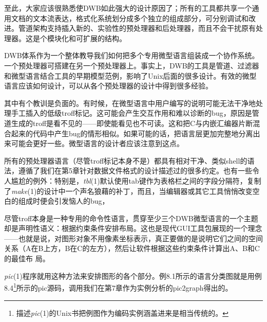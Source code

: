 \documentclass[12pt,oneside]{book}
\begin{document}
\begin{common-format}
至此，大家应该很熟悉使DWB如此强大的设计原因了；所有的工具都共享一个通用文档的文本流表达，格式化系统划分成多个独立的组成部分，可分别调试和改进。管道架构支持插入新的、实验性的预处理器和后处理器，而且不会干扰原有处理器。这是个模块化和可扩展的结构。

DWB体系作为一个整体教导我们如何把多个专用微型语言组装成一个协作系统。一个预处理器可搭建在另一个预处理器上。事实上，DWB的工具是管道、过滤器和微型语言结合工具的早期模型范例，影响了Unix后面的很多设计。有效的微型语言应该如何设计，可以从各个预处理器的设计中得到很多经验。

其中有个教训是负面的。有时候，在微型语言中用户编写的说明可能无法干净地处理手工插入的低级troff标记。这可能会产生交互作用和难以诊断的bug，原因是管道生成的troff是看不见的——即使能看见也不可读。这和把C与内嵌汇编器片断混合起来的代码中产生bug的情形相似。如果可能的话，把语言层更加完整地分离出来可能会更好一些。微型语言的设计者应该注意到这点。

所有的预处理器语言（尽管troff标记本身不是）都具有相对干净、类似shell的语法，遵循了我们在第5章针对数据文件格式的设计描述过的很多约定。也有一些令人尴尬的例外：特别是，\textit{tbl}(1)默认使用tab键作为表格栏之间的字段分隔符，复制了\textit{make}(1)的设计中一个声名狼藉的补丁，而且，当编辑器或其它工具悄悄改变空白的组成时便会引发恼人的bug，

尽管troff本身是一种专用的命令性语言，贯穿至少三个DWB微型语言的一个主题却是声明性语义：根据约束条件安排布局。这也是现代GUI工具包展现的一个理念——也就是说，对图形对象不用像素坐标表示，真正要做的是说明它们之间的空间关系（A在B上方，B在C的左方），然后让软件根据这些约束条件计算出A、B和C的最佳布
局。

\textit{pic}(1)程序就用这种方法来安排图形的各个部分。例8.1所示的语言分类图就是用例8.4\footnote{描述\textit{pic}(1)的Unix书把例图作为编码实例涵盖进来是相当传统的。}所示的pic源码，调用我们在第7章作为实例分析的pic2graph得出的。


\end{common-format}
\end{document}
